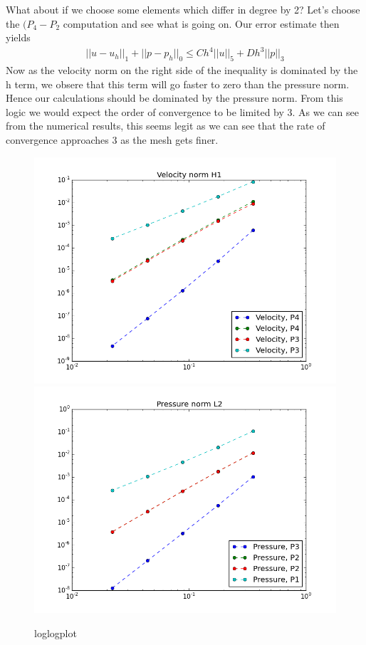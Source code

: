 \documentclass[a4paper,norsk]{article}
\begin{document}
What  about if we choose some elements which differ in degree by 2? Let's choose the $(P_4 - P_2$ computation and see what is going on. Our error estimate then yields
\begin{align*}
 ||u - u_h||_1 + ||p - p_h||_0 \leq Ch^4||u||_{5} + Dh^{3} ||p||_{3}
\end{align*}
Now as the velocity norm on the right side of the inequality is dominated by the h term, we obsere that this term will go faster to zero than the pressure norm. Hence our 
calculations should be dominated by the pressure norm. From this logic we would expect the order of convergence to be limited by 3. As we can see from the numerical results, this seems 
legit as we can see that the rate of convergence approaches 3 as the mesh gets finer. 


\begin{figure}[h!]
	\centering
	\caption*{loglogplot}
	\includegraphics[scale=0.32]{velocity.png}
		\includegraphics[scale=0.32]{pressure.png}
\end{figure}
\end{document}
